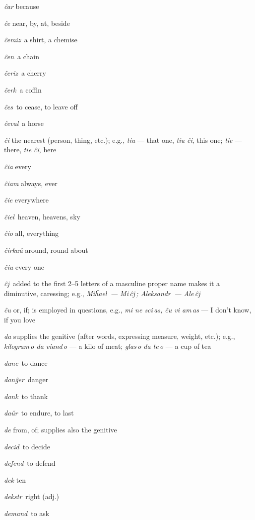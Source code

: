 \begin{landscape}
\begin{multicols}{5}
\begin{outdent}{1em}
\emph{ĉar} because

\emph{ĉe} near, by, at, beside

\emph{ĉemiz\,} a shirt, a chemise

\emph{ĉen\,} a chain

\emph{ĉeriz\,} a cherry

\emph{ĉerk\,} a coffin

\emph{ĉes\,} to cease, to leave off

\emph{ĉeval\,} a horse

\emph{ĉi} the nearest (person, thing, etc.); e.g., \emph{tiu} — that one, \emph{tiu ĉi}, this one; \emph{tie} — there, \emph{tie ĉi}, here

\emph{ĉia} every

\emph{ĉiam} always, ever

\emph{ĉie} everywhere

\emph{ĉiel\,} heaven, heavens, sky

\emph{ĉio} all, everything

\emph{ĉirkaŭ} around, round about

\emph{ĉiu} every one

\emph{ĉj\,} added to the first 2--5 letters of a masculine proper name makes it a diminutive, caressing; e.g., \emph{Miĥael\, — Mi\,ĉj\,; Aleksandr\, — Ale\,ĉj\,} 

\emph{ĉu} or, if; is employed in questions, e.g., \emph{mi ne sci\,as, ĉu vi am\,as} — I don’t know, if you love
\end{outdent}


\begin{outdent}{1em}
\emph{da} supplies the genitive (after words, expressing measure, weight, etc.); e.g., \emph{kilogram\,o da viand\,o} — a kilo of meat; \emph{glas\,o da te\,o} — a cup of tea

\emph{danc\,} to dance

\emph{danĝer\,} danger

\emph{dank\,} to thank

\emph{daŭr\,} to endure, to last

\emph{de} from, of; supplies also the genitive

\emph{decid\,} to decide

\emph{defend\,} to defend

\emph{dek} ten

\emph{dekstr\,} right (adj.)

\emph{demand\,} to ask


\end{outdent}
\end{multicols}
\end{landscape}
